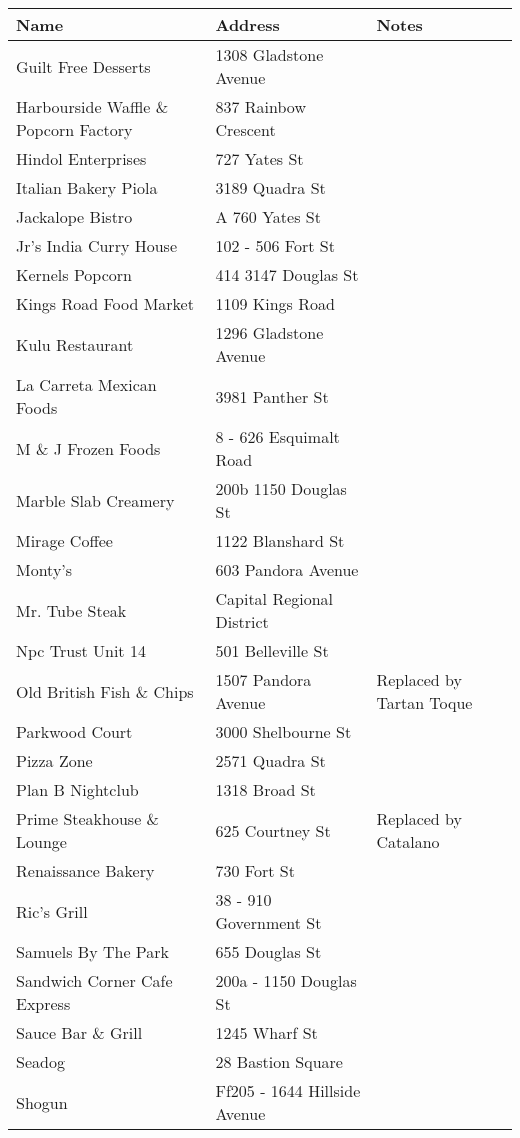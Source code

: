 \documentclass[9pt]{article}
\begin{document}
\noindent
\begin{center}
\begin{tabular}{l|l|l}
\textbf{Name} & \textbf{Address} & \textbf{Notes}\\
\hline
Guilt Free Desserts & 1308 Gladstone Avenue & \\
Harbourside Waffle \& Popcorn Factory & 837 Rainbow Crescent & \\
Hindol Enterprises & 727 Yates St & \\
Italian Bakery Piola & 3189 Quadra St & \\
Jackalope Bistro & A 760 Yates St & \\
Jr's India Curry House & 102 - 506 Fort St & \\
Kernels Popcorn & 414 3147 Douglas St & \\
Kings Road Food Market & 1109 Kings Road & \\
Kulu Restaurant & 1296 Gladstone Avenue & \\
La Carreta Mexican Foods & 3981 Panther St & \\
M \& J Frozen Foods & 8 - 626 Esquimalt Road & \\
Marble Slab Creamery & 200b 1150 Douglas St & \\
Mirage Coffee & 1122 Blanshard St & \\
Monty's & 603 Pandora Avenue & \\
Mr. Tube Steak  & Capital Regional District & \\
Npc Trust Unit 14 & 501 Belleville St & \\
Old British Fish \& Chips & 1507 Pandora Avenue & Replaced by Tartan Toque\\
Parkwood Court & 3000 Shelbourne St & \\
Pizza Zone & 2571 Quadra St & \\
Plan B Nightclub & 1318 Broad St & \\
Prime Steakhouse \& Lounge & 625 Courtney St & Replaced by Catalano\\
Renaissance Bakery & 730 Fort St & \\
Ric's Grill & 38 - 910 Government St & \\
Samuels By The Park & 655 Douglas St & \\
Sandwich Corner Cafe Express & 200a - 1150 Douglas St & \\
Sauce Bar \& Grill & 1245 Wharf St & \\
Seadog & 28 Bastion Square & \\
Shogun & Ff205 - 1644 Hillside Avenue & \\

\end{tabular}
\end{center}
\end{document}

